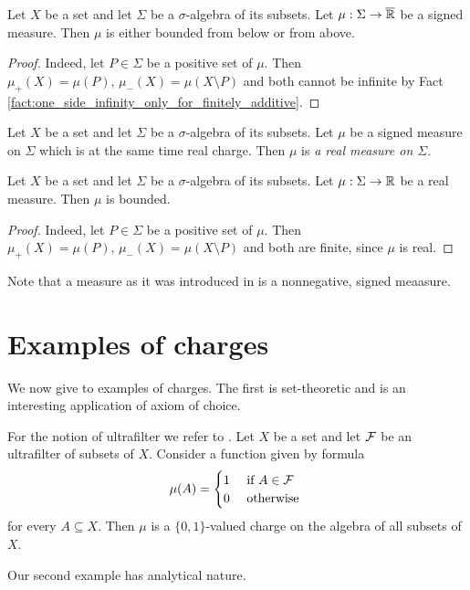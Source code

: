 \begin{corollary}\label{corollary:signed_measures_are_one_sided_bounded}
    Let $X$ be a set and let $\Sigma$ be a $\sigma$-algebra of its subsets. Let $\mu:\Sigma \rightarrow \overline{{\mathbb R}}$ be a signed measure. Then $\mu$ is either bounded from below or from above.
\end{corollary}
\begin{proof}
    Indeed, let $P \in \Sigma$ be a positive set of $\mu$. Then $\mu_+(X) = \mu(P),\,\mu_-(X) = \mu(X\setminus P)$ and both cannot be infinite by Fact \ref{fact:one_side_infinity_only_for_finitely_additive}.
\end{proof}

\begin{definition}
    Let $X$ be a set and let $\Sigma$ be a $\sigma$-algebra of its subsets. Let $\mu$ be a signed measure on $\Sigma$ which is at the same time real charge. Then $\mu$ is \textit{a real measure on $\Sigma$}.
\end{definition}

\begin{corollary}\label{corollary:real_measures_are_bounded}
    Let $X$ be a set and let $\Sigma$ be a $\sigma$-algebra of its subsets. Let $\mu:\Sigma \rightarrow {\mathbb R}$ be a real measure. Then $\mu$ is bounded.
\end{corollary}
\begin{proof}
    Indeed, let $P \in \Sigma$ be a positive set of $\mu$. Then $\mu_+(X) = \mu(P),\,\mu_-(X) = \mu(X\setminus P)$ and both are finite, since $\mu$ is real.
\end{proof}

\begin{remark}\label{remark:measure_is_nonnegative_signed_measure}
    Note that a measure as it was introduced in \cite{Integration} is a nonnegative, signed meaasure.
\end{remark}


\section{Examples of charges}
\noindent
We now give to examples of charges. The first is set-theoretic and is an interesting application of axiom of choice.

\begin{example}\label{example:ultrafilter_charge}
    For the notion of ultrafilter we refer to \cite{Filters_in_topology}. Let $X$ be a set and let ${\mathcal F}$ be an ultrafilter of subsets of $X$. Consider a function given by formula
    $$\mu(A) = \begin{cases}
            1 & \mbox{ if }A \in {\mathcal F} \\
            0 & \mbox{ otherwise }   \\
        \end{cases}
    $$
    for every $A \subseteq X$. Then $\mu$ is a $\{0,1\}$-valued charge on the algebra of all subsets of $X$.
\end{example}
\noindent
Our second example has analytical nature.

